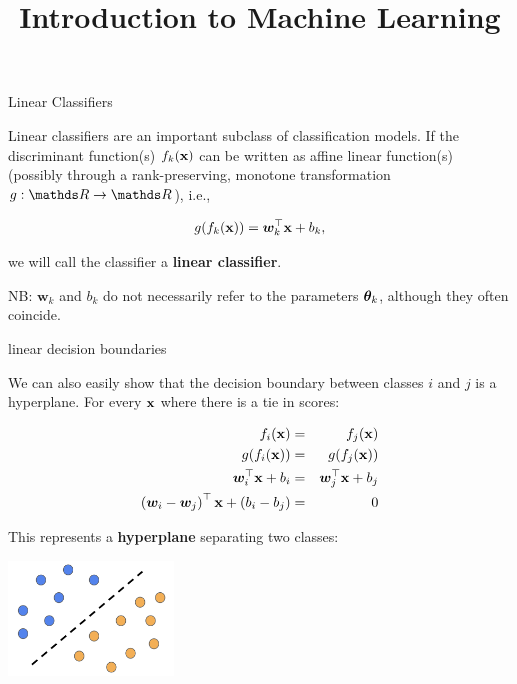 \documentclass[11pt,compress,t,notes=noshow, xcolor=table]{beamer}
\title{Introduction to Machine Learning}
\begin{document}

\framebreak


\begin{vbframe}{Linear Classifiers}

Linear classifiers are an important subclass of classification models. 
If the discriminant function(s) $\fkx$ can be written as affine linear function(s) (possibly through a rank-preserving,
monotone transformation $g: \R \to \R$), i.e., 

$$
  g(\fkx) = \bm{w}_k^\top \xv + b_k,
$$

we will call the classifier a \textbf{linear classifier}. 

\vfill

NB: $\bm{w}_k$ and $b_k$ do not necessarily refer to the parameters $\thetav_k$, although they often coincide.

\end{vbframe}

  
\begin{vbframe}{linear decision boundaries}
  
We can also easily show that the decision boundary between classes $i$ and $j$ is a hyperplane. For every $\xv$ where there is a tie in scores: 

\begin{eqnarray*}
  \fkx[i] &=& \fkx[j] \\
  g(\fkx[i]) &=& g(\fkx[j]) \\
  \bm{w}_i^\top \xv + b_i &=& \bm{w}_j^\top \xv + b_j \\
  \left(\bm{w}_i - \bm{w}_j\right)^\top \xv + \left(b_i - b_j\right) &=& 0 
\end{eqnarray*}

This represents a \textbf{hyperplane} separating two classes:

\begin{center}
\includegraphics[width=0.33\textwidth]{figure_man/linear_boundary.png} 
\end{center}
\end{vbframe}
\end{document}
